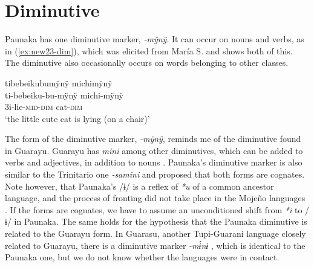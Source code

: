 


\section{Diminutive}\label{sec:Diminutives}

Paunaka has one diminutive marker, \textit{-mÿnÿ}. It can occur on nouns and verbs, as in (\ref{ex:new23-dim}), which was elicited from María S. and shows both of this. The diminutive also occasionally occurs on words belonging to other classes. 

\ea\label{ex:new23-dim}
\begingl
\glpreamble tibebeikubumÿnÿ michimÿnÿ\\
\gla ti-bebeiku-bu-mÿnÿ michi-mÿnÿ\\
\glb 3i-lie-\textsc{mid}-\textsc{dim} cat-\textsc{dim}\\
\glft ‘the little cute cat is lying (on a chair)’
\endgl
\trailingcitation{[rxx-e181024l.066]}
\xe

The form of the diminutive marker, \textit{-mÿnÿ}, reminds me of the diminutive found in Guarayu. Guarayu has \textit{mini} among other diminutives, which can be added to verbs and adjectives, in addition to nouns \citep[13]{Hoeller1932a}. Paunaka’s diminutive marker is also similar to the Trinitario one \textit{-samini} and \citet[174--175]{Rose2018} proposed that both forms are cognates. Note however, that Paunaka’s /ɨ/ is a reflex of \textit{*u} of a common ancestor language, and the process of fronting did not take place in the Mojeño languages \citep[cf.][418]{deCarvalhoPAU}. If the forms are cognates, we have to assume an unconditioned shift from \textit{*i} to /ɨ/ in Paunaka. The same holds for the hypothesis that the Paunaka diminutive is related to the Guarayu form. In Guarasu, another Tupi-Guarani language closely related to Guarayu, there is a diminutive marker \textit{-m\'{ɨ}nɨ} \citep[437]{RamirezAL2017}, which is identical to the Paunaka one, but we do not know whether the languages were in contact.

